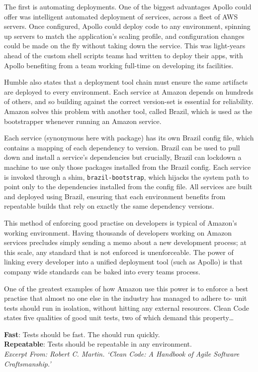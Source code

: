 \documentclass[11pt]{article}
\begin{document}
The first is automating deployments. One of the biggest advantages Apollo could
offer was intelligent automated deployment of services, across a fleet of AWS
servers. Once configured, Apollo could deploy code to any environment, spinning
up servers to match the application's scaling profile, and configuration changes
could be made on the fly without taking down the service. This was light-years
ahead of the custom shell scripts teams had written to deploy their apps, with
Apollo benefiting from a team working full-time on developing its facilities.

Humble also states that a deployment tool chain must ensure the same artifacts
are deployed to every environment. Each service at Amazon depends on hundreds of
others, and so building against the correct version-set is essential for
reliability. Amazon solves this problem with another tool, called Brazil, which
is used as the bootstrapper whenever running an Amazon service.

Each service (synonymous here with package) has its own Brazil config file,
which contains a mapping of each dependency to version. Brazil can be used to
pull down and install a service's dependencies but crucially, Brazil can
lockdown a machine to use only those packages installed from the Brazil config.
Each service is invoked through a shim, \texttt{brazil-bootstrap}, which hijacks
the system path to point only to the dependencies installed from the config
file.  All services are built and deployed using Brazil, ensuring that each
environment benefits from repeatable builds that rely on exactly the same
dependency versions.

This method of enforcing good practise on developers is typical of Amazon's
working environment. Having thousands of developers working on Amazon services
precludes simply sending a memo about a new development process; at this scale,
any standard that is not enforced is unenforceable. The power of linking every
developer into a unified deployment tool (such as Apollo) is that company wide
standards can be baked into every teams process.

One of the greatest examples of how Amazon use this power is to enforce a best
practise that almost no one else in the industry has managed to adhere to- unit
tests should run in isolation, without hitting any external resources. Clean
Code~\cite{cleanCode} states five qualities of good unit tests, two of which
demand this property\dots

\begin{displayquote}

  \textbf{Fast}: Tests should be fast. The should run quickly. \\
  \textbf{Repeatable}: Tests should be repeatable in any environment. \\

  \textit{Excerpt From: Robert C. Martin. `Clean Code: A Handbook of Agile
  Software Craftsmanship.'}

\end{displayquote}
\end{document}
